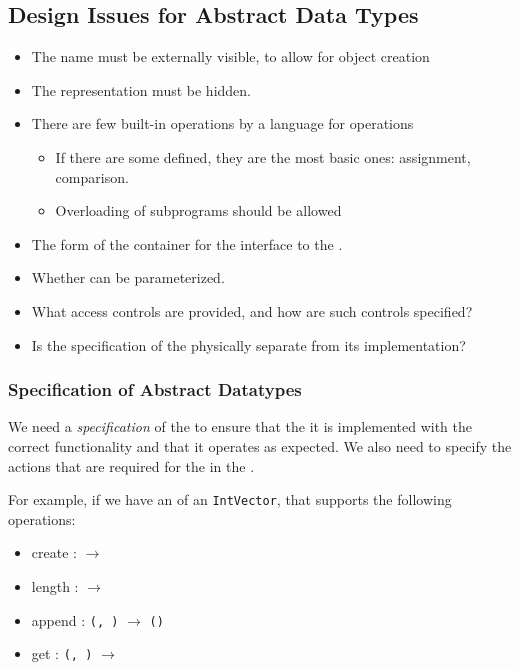 \subsection{Design Issues for Abstract Data Types}\label{subsec:ADT_Design_Issues}
\begin{itemize}[noitemsep]
\item The  name must be externally visible, to allow for object creation
\item The  representation must be hidden.
\item There are few built-in operations by a language for  operations
  \begin{itemize}[noitemsep]
  \item If there are some defined, they are the most basic ones: assignment, comparison.
  \item Overloading of subprograms should be allowed
  \end{itemize}
\item The form of the container for the interface to the .
\item Whether  can be parameterized.
\item What access controls are provided, and how are such controls specified?
\item Is the specification of the  physically separate from its implementation?
\end{itemize}

\subsubsection{Specification of Abstract Datatypes}\label{subsubsec:Specification_Abstract_Datatype}
\begin{definition}[Specification]\label{def:ADT_Specification}
  We need a \emph{specification} of the  to ensure that the it is implemented with the correct functionality and that it operates as expected.
  We also need to specify the actions that are required for the  in the .
\end{definition}

For example, if we have an  of an \texttt{IntVector}, that supports the following operations:
\begin{itemize}[noitemsep]
\item create : \texttt{} $\rightarrow$ \texttt{}
\item length : \texttt{} $\rightarrow$ \texttt{}
\item append : \texttt{(, )} $\rightarrow$ \texttt{()}
\item get : \texttt{(, )} $\rightarrow$ \texttt{}
\end{itemize}

